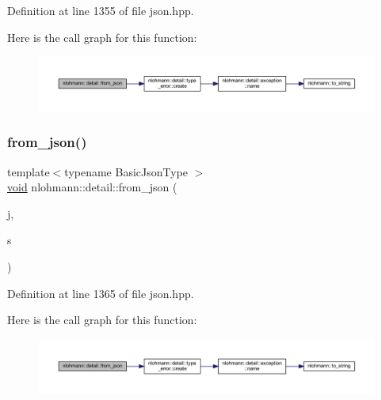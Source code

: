 Definition at line 1355 of file json.\+hpp.

Here is the call graph for this function\+:
\nopagebreak
\begin{figure}[H]
\begin{center}
\leavevmode
\includegraphics[width=350pt]{namespacenlohmann_1_1detail_a58117f225f43d03e3a0a4a6f3d77c9d9_cgraph}
\end{center}
\end{figure}
\mbox{\label{namespacenlohmann_1_1detail_ad74d89f77ada7a57eff38b43d4bf2335}} 
\subsubsection{\texorpdfstring{from\_json()}{from\_json()}\hspace{0.1cm}{\footnotesize\ttfamily [3/18]}}
{\footnotesize\ttfamily template$<$typename Basic\+Json\+Type $>$ \\
\mbox{\hyperlink{namespacenlohmann_1_1detail_a59fca69799f6b9e366710cb9043aa77d}{void}} nlohmann\+::detail\+::from\+\_\+json (\begin{DoxyParamCaption}\item[{const Basic\+Json\+Type \&}]{j,  }\item[{typename Basic\+Json\+Type\+::string\+\_\+t \&}]{s }\end{DoxyParamCaption})}



Definition at line 1365 of file json.\+hpp.

Here is the call graph for this function\+:
\nopagebreak
\begin{figure}[H]
\begin{center}
\leavevmode
\includegraphics[width=350pt]{namespacenlohmann_1_1detail_ad74d89f77ada7a57eff38b43d4bf2335_cgraph}
\end{center}
\end{figure}
\mbox{\label{namespacenlohmann_1_1detail_a2932f2bc2943dac6d51669312f4fc0f5}} 
